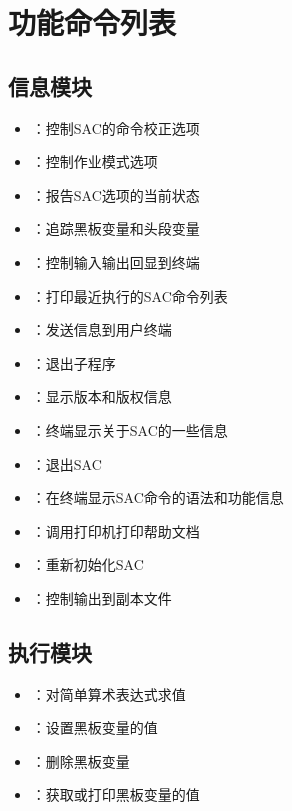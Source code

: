 \section*{功能命令列表}

\subsection*{信息模块}
\begin{itemize}
\item {}：控制SAC的命令校正选项
\item {}：控制作业模式选项
\item {}：报告SAC选项的当前状态
\item {}：追踪黑板变量和头段变量
\item {}：控制输入输出回显到终端
\item {}：打印最近执行的SAC命令列表
\item {}：发送信息到用户终端
\item {}：退出子程序
\item {}：显示版本和版权信息
\item {}：终端显示关于SAC的一些信息
\item {}：退出SAC
\item {}：在终端显示SAC命令的语法和功能信息
\item {}：调用打印机打印帮助文档
\item {}：重新初始化SAC
\item {}：控制输出到副本文件
\end{itemize}

\subsection*{执行模块}
\begin{itemize}
\item {}：对简单算术表达式求值
\item {}：设置黑板变量的值
\item {}：删除黑板变量
\item {}：获取或打印黑板变量的值
\end{itemize}

